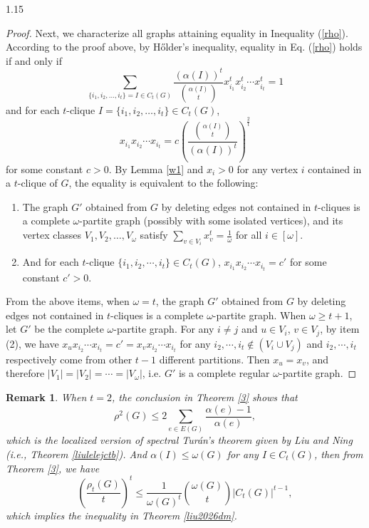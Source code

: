 \documentclass[preprint,12pt]{elsarticle1}
\newtheorem{remark}[thm]{Remark}
\numberwithin{equation}{section}
\begin{document}
\begin{spacing}{1.15}
\begin{proof}
Next, we characterize all graphs attaining equality in Inequality (\ref{rho}).
According to the proof above, by H\H{o}lder's inequality, equality in Eq. (\ref{rho}) holds if and only if $$\sum_{\{i_1,i_2,\ldots,i_t\}=I\in C_t(G)}\frac{\left(\alpha(I)\right)^t}{\binom{\alpha(I)}{t}}x_{i_1}^{t} x_{i_2}^{t}\cdots x_{i_t}^{t}=1$$ and for each $t$-clique $I=\{i_1,i_2,\ldots,i_t\}\in C_{t}(G)$, $$x_{i_1}x_{i_2}\cdots x_{i_t}=c\left(\frac{\binom{\alpha(I)}{t}}{\left(\alpha(I)\right)^t}\right)^{\frac{2}{t}}$$ for some constant $c>0$.
By Lemma \ref{w1} and $x_i>0$ for any vertex $i$ contained in a $t$-clique of $G$, the equality is equivalent to the following:
\begin{enumerate}
    \item[(1)] The graph $G'$ obtained from $G$ by deleting edges not contained in $t$-cliques is a complete $\omega$-partite graph (possibly with some isolated vertices), and its vertex classes $V_1,V_2,\ldots,V_{\omega}$ satisfy $\sum_{v\in V_i}x_v^{t}=\frac{1}{\omega}$ for all $i\in[\omega]$.
    \item[(2)] And for each $t$-clique $\{i_1,i_2,\cdots,i_t\}\in C_t(G)$, $x_{i_1} x_{i_2}\cdots x_{i_t} = c'$ for some constant $c'>0$.
\end{enumerate}


From the above items, when $\omega = t$, the graph $G'$ obtained from $G$ by deleting edges not contained in $t$-cliques is a complete $\omega$-partite graph. When $\omega \geq t+1$, let $G'$ be the complete $\omega$-partite graph. For any $i \ne j$ and $u \in V_i$, $v \in V_j$, by item (2), we have $x_{u} x_{i_2}\cdots x_{i_t}= c' =x_{v} x_{i_2}\cdots x_{i_t}$ for any $i_2,\cdots,i_t\notin\left(V_i \cup V_j\right)$ and $i_2,\cdots,i_t$ respectively come from other $t-1$ different partitions. Then $x_u = x_v$, and therefore $|V_1| = |V_2| = \cdots = |V_\omega|$, i.e. $G'$ is a complete regular $\omega$-partite graph.
\end{proof}

\begin{remark}
When $t=2$, the conclusion in Theorem \ref{3} shows that $$\rho^2(G)\le2\sum_{e\in E(G)}\frac{\alpha(e)-1}{\alpha(e)},$$ which is the localized version of spectral Tur\'{a}n's theorem given by Liu and Ning \cite{liulelejctb} (i.e., Theorem \ref{liulelejctb}).
And $\alpha(I)\le \omega(G)$ for any $I\in C_t(G)$, then from Theorem \ref{3}, we have $$\left( \frac{\rho_t(G)}{t} \right)^{t}\le \frac{1}{\omega(G)^t}\binom{\omega(G)}{t}|C_t(G)|^{t-1},$$ which implies the inequality in Theorem \ref{liu2026dm}.
\end{remark}


\end{spacing}
\end{document}
